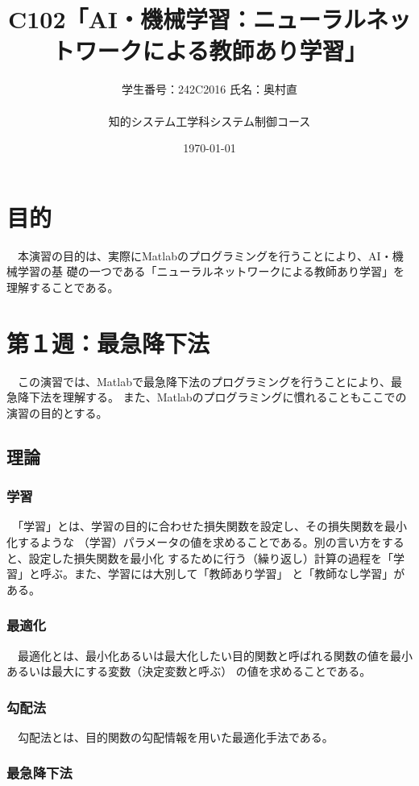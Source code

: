 \documentclass[10pt,a4paper,titlepage]{jreport} %
\title{C102「AI・機械学習：ニューラルネットワークによる教師あり学習」} %
\author{
  学生番号：242C2016  氏名：奥村直 \\
  \\
  知的システム工学科システム制御コース
  } %
\date{\today} %
\begin{document}
\maketitle

\chapter{目的}

　本演習の目的は、実際にMatlabのプログラミングを行うことにより、AI・機械学習の基
礎の一つである「ニューラルネットワークによる教師あり学習」を理解することである。

\chapter{第１週：最急降下法}

　この演習では、Matlabで最急降下法のプログラミングを行うことにより、最急降下法を理解する。
また、Matlabのプログラミングに慣れることもここでの演習の目的とする。

\section{理論}

\subsection{学習}

　「学習」とは、学習の目的に合わせた損失関数を設定し、その損失関数を最小化するような
（学習）パラメータの値を求めることである。別の言い方をすると、設定した損失関数を最小化
するために行う（繰り返し）計算の過程を「学習」と呼ぶ。また、学習には大別して「教師あり学習」
と「教師なし学習」がある。

\subsection{最適化}

　最適化とは、最小化あるいは最大化したい目的関数と呼ばれる関数の値を最小あるいは最大にする変数（決定変数と呼ぶ）
の値を求めることである。

\subsection{勾配法}

　勾配法とは、目的関数の勾配情報を用いた最適化手法である。

\subsection{最急降下法}
\end{document}
